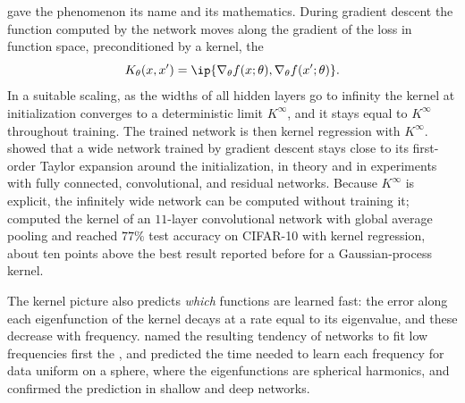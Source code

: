 \begin{refsection}
\Textcite{JacotEtAl2018} gave the phenomenon its name and its mathematics. During gradient descent the function computed by the network moves along the gradient of the loss in function space, preconditioned by a kernel, the 
\[
  K_\theta(x,x')=\ip{\nabla_\theta f(x;\theta),\nabla_\theta f(x';\theta)} .
\]
In a suitable scaling, as the widths of all hidden layers go to infinity the kernel at initialization converges to a deterministic limit $K^\infty$, and it stays equal to $K^\infty$ throughout training. The trained network is then kernel regression with $K^\infty$. \Textcite{LeeEtAl2019} showed that a wide network trained by gradient descent stays close to its first-order Taylor expansion around the initialization, in theory and in experiments with fully connected, convolutional, and residual networks. Because $K^\infty$ is explicit, the infinitely wide network can be computed without training it; \textcite{AroraEtAl2019a} computed the kernel of an $11$-layer convolutional network with global average pooling and reached $77\%$ test accuracy on CIFAR-10 with kernel regression, about ten points above the best result reported before for a Gaussian-process kernel.

The kernel picture also predicts \emph{which} functions are learned fast: the error along each eigenfunction of the kernel decays at a rate equal to its eigenvalue, and these decrease with frequency. \Textcite{RahamanEtAl2019} named the resulting tendency of networks to fit low frequencies first the , and \textcite{BasriEtAl2019} predicted the time needed to learn each frequency for data uniform on a sphere, where the eigenfunctions are spherical harmonics, and confirmed the prediction in shallow and deep networks.



\end{refsection}
